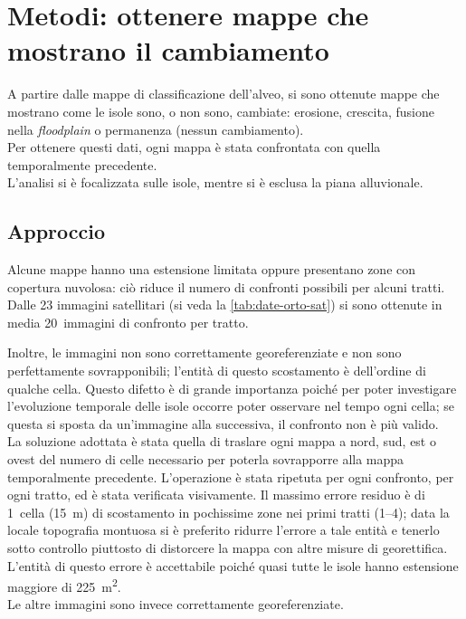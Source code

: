 \section{Metodi: ottenere mappe che mostrano il cambiamento}
\label{sec:cambiamento}
A partire dalle mappe di classificazione dell'alveo, si sono ottenute mappe che mostrano come le isole sono, o non sono, cambiate: erosione, crescita, fusione nella \emph{floodplain} o permanenza (nessun cambiamento).
\\
Per ottenere questi dati, ogni mappa è stata confrontata con quella temporalmente precedente.
\\
L'analisi si è focalizzata sulle isole, mentre si è esclusa la piana alluvionale.

\subsection{Approccio}
\label{subsec:camb-approccio}
Alcune mappe hanno una estensione limitata oppure presentano zone con copertura nuvolosa: ciò riduce il numero di confronti possibili per alcuni tratti. 
Dalle 23 immagini satellitari (si veda la \cref{tab:date-orto-sat}) si sono ottenute in media 20~immagini di confronto per tratto.

Inoltre, le immagini \AST{} non sono correttamente georeferenziate e non sono perfettamente sovrapponibili; l'entità di questo scostamento è dell'ordine di qualche cella.
Questo difetto è di grande importanza poiché per poter investigare l'evoluzione temporale delle isole occorre poter osservare nel tempo ogni cella; se questa si sposta da un'immagine alla successiva, il confronto non è più valido.
\\
La soluzione adottata è stata quella di traslare ogni mappa a nord, sud, est o ovest del numero di celle necessario per poterla sovrapporre alla mappa temporalmente precedente.
L'operazione è stata ripetuta per ogni confronto, per ogni tratto, ed è stata verificata visivamente.
Il massimo errore residuo è di 1~cella (\SI{15}{\m}) di scostamento in pochissime zone nei primi tratti (\numrange[range-phrase={ - }]{1}{4}); data la locale topografia montuosa si è preferito ridurre l'errore a tale entità e tenerlo sotto controllo piuttosto di distorcere la mappa con altre misure di georettifica.
L'entità di questo errore è accettabile poiché quasi tutte le isole hanno estensione maggiore di \SI{225}{\m\tothe{2}}.
\\
Le altre immagini sono invece correttamente georeferenziate.

